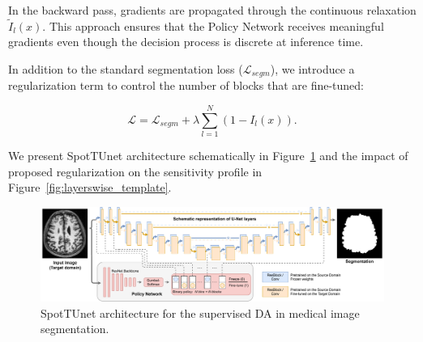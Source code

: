 %

In the backward pass, gradients are propagated through the continuous relaxation $\tilde{I}_l(x)$. This approach ensures that the Policy Network receives meaningful gradients even though the decision process is discrete at inference time.


In addition to the standard segmentation loss ($\mathcal{L}_{segm}$), we introduce a regularization term to control the number of blocks that are fine-tuned:

\begin{equation}
	\mathcal{L} = \mathcal{L}_{segm} + \lambda \sum_{l=1}^N \left( 1 - I_l (x) \right).
\end{equation}

We present SpotTUnet architecture schematically in Figure~\ref{fig:spottune_seg} and the impact of proposed regularization on the sensitivity profile in Figure~\ref{fig:layerswise_template}.

\begin{landscape}
	\begin{figure}[p]
		\centering
		\includegraphics[width=\linewidth]{Dissertation/Figures/2_mri/spottune_seg.pdf}
		\caption{SpotTUnet architecture for the supervised DA in medical image segmentation.}%
	\label{fig:spottune_seg}
\end{figure}
\end{landscape}

